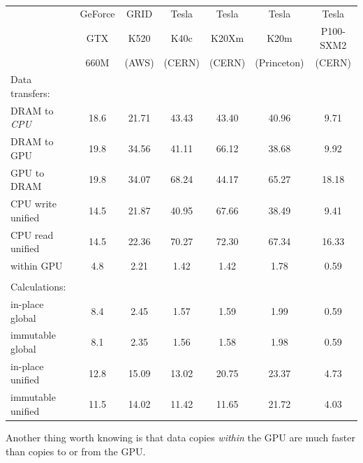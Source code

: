 \documentclass[12pt]{article}
\begin{document}
\begin{table}
\caption{\label{gpu-results} }

\begin{center}
\begin{tabular}{l c c c c c c}
                  &  GeForce & GRID     & Tesla  & Tesla  & Tesla       & Tesla     \\
                  &  GTX     & K520     & K40c   & K20Xm  & K20m        & P100-SXM2 \\
                  &  660M    & (AWS)    & (CERN) & (CERN) & (Princeton) & (CERN)    \\
Data transfers:   &          &          &        &        &             &           \\\hline
DRAM to {\it CPU} & 18.6     &    21.71 &  43.43 &  43.40 &       40.96 &      9.71 \\
DRAM to GPU       & 19.8     &    34.56 &  41.11 &  66.12 &       38.68 &      9.92 \\
GPU to DRAM       & 19.8     &    34.07 &  68.24 &  44.17 &       65.27 &     18.18 \\
CPU write unified & 14.5     &    21.87 &  40.95 &  67.66 &       38.49 &      9.41 \\
CPU read unified  & 14.5     &    22.36 &  70.27 &  72.30 &       67.34 &     16.33 \\
within GPU        &  4.8     &     2.21 &   1.42 &   1.42 &        1.78 &      0.59 \\
                  &          &          &        &        &             &           \\
Calculations:     &          &          &        &        &             &           \\\hline
in-place global   &  8.4     &     2.45 &   1.57 &   1.59 &        1.99 &      0.59 \\
immutable global  &  8.1     &     2.35 &   1.56 &   1.58 &        1.98 &      0.59 \\
in-place unified  & 12.8     &    15.09 &  13.02 &  20.75 &       23.37 &      4.73 \\
immutable unified & 11.5     &    14.02 &  11.42 &  11.65 &       21.72 &      4.03 \\
\end{tabular}
\end{center}
\end{table}

Another thing worth knowing is that data copies {\it within} the GPU are much faster than copies to or from the GPU.
\end{document}
